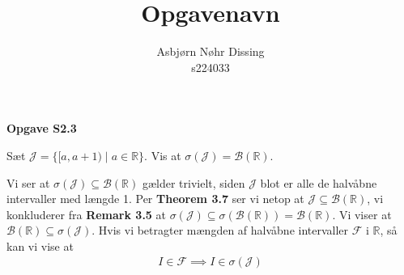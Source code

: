 \documentclass[11pt]{article}
\newenvironment{opgave}[1]
{
    \begin{samepage}
    \begin{mdframed}
    {\bfseries Opgave #1 \\}
}
{
    \end{mdframed}
    \end{samepage}
}
\begin{document}
\author{Asbjørn Nøhr Dissing\\s224033}
\title{Opgavenavn}
\maketitle

\newpage
\begin{opgave}{S2.3}
Sæt $\mathcal{J}=\{[a, a+1) \mid a \in \mathbb{R}\} .$ Vis at $\sigma(\mathcal{J})=\mathcal{B}(\mathbb{R})$.
\end{opgave}
Vi ser at $ \sigma(\mathcal{J}) \subseteq \mathcal{B} (\mathbb{R}) $ gælder trivielt, siden $ \mathcal{J} $ blot er alle de halvåbne intervaller med længde 1. Per \textbf{Theorem 3.7} ser vi netop at $ \mathcal{J} \subseteq \mathcal{B} (\mathbb{R})$, vi konkluderer fra \textbf{Remark 3.5} at $ \sigma(\mathcal{J}) \subseteq \sigma(\mathcal{B} (\mathbb{R})) = \mathcal{B} (\mathbb{R}) $. Vi viser at $ \mathcal{B} (\mathbb{R}) \subseteq \sigma(\mathcal{J}) $. Hvis vi betragter mængden af halvåbne intervaller $ \mathcal{F} $ i $ \mathbb{R} $, så kan vi vise at
\begin{align*}
    I \in \mathcal{F} \implies I \in \sigma(\mathcal{J})
\end{align*}
\end{document}
